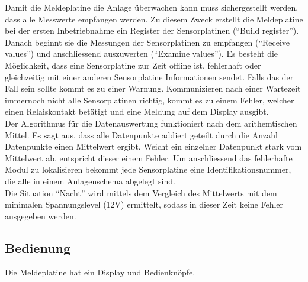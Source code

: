 \newpage
Damit die Meldeplatine die Anlage überwachen kann muss sichergestellt werden, dass alle Messwerte empfangen werden. Zu diesem Zweck erstellt die Meldeplatine bei der ersten Inbetriebnahme ein Register der Sensorplatinen (``Build register''). Danach beginnt sie die Messungen der Sensorplatinen zu empfangen (``Receive values'') und anschliessend auszuwerten (``Examine values''). Es besteht die Möglichkeit, dass eine Sensorplatine zur Zeit offline ist, fehlerhaft oder gleichzeitig mit einer anderen Sensorplatine Informationen sendet. Falls das der Fall sein sollte kommt es zu einer Warnung. Kommunizieren nach einer Wartezeit immernoch nicht alle Sensorplatinen richtig, kommt es zu einem Fehler, welcher einen Relaiskontakt betätigt und eine Meldung auf dem Display ausgibt.\\
Der Algorithmus für die Datenauswertung funktioniert nach dem arithemtischen Mittel. Es sagt aus, dass alle Datenpunkte addiert geteilt durch die Anzahl Datenpunkte einen Mittelwert ergibt. Weicht ein einzelner Datenpunkt stark vom Mittelwert ab, entspricht dieser einem Fehler. Um anschliessend das fehlerhafte Modul zu lokalisieren bekommt jede Sensorplatine eine Identifikationsnummer, die alle in einem Anlagenschema abgelegt sind.\\

Die Situation ``Nacht'' wird mittels dem Vergleich des Mittelwerts mit dem minimalen Spannungslevel (12V) ermittelt, sodass in dieser Zeit keine Fehler ausgegeben werden.

\subsection{Bedienung}
Die Meldeplatine hat ein Display und Bedienknöpfe. 
%